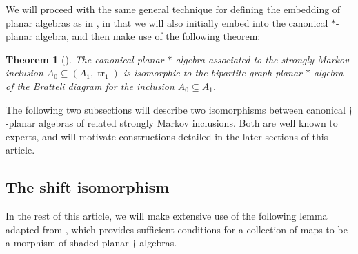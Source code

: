 \documentclass[11pt]{article}
\theoremstyle{plain}
\newtheorem{thm}{Theorem}[section]
\theoremstyle{definition}
\DeclareMathOperator{\tr}{tr}
\begin{document}
We will proceed with the same general technique for defining the embedding of planar algebras as in \cite{MR2812459}, in that we will also initially embed into the canonical $\ast$-planar algebra, and then make use of the following theorem:

\begin{thm}[{\cite[Theorem 3.28]{MR2812459}}] \label{planaralgebraisomorphism}
The canonical planar $\ast$-algebra associated to the strongly Markov inclusion $A_0\subseteq (A_1,\tr_1)$ is isomorphic to the bipartite graph planar $\ast$-algebra of the Bratteli diagram for the inclusion $A_0\subseteq A_1$.
\end{thm}

The following two subsections will describe two isomorphisms between canonical $\dag$-planar algebras of related strongly Markov inclusions. Both are well known to experts, and will motivate constructions detailed in the later sections of this article.

\subsection{The shift isomorphism} 
\label{ssec:shift}

In the rest of this article, we will make extensive use of the following lemma adapted from \cite[Lem.~2.49]{MR2812459}, which provides sufficient conditions for a collection of maps to be a morphism of shaded planar $\dag$-algebras.
\end{document}
